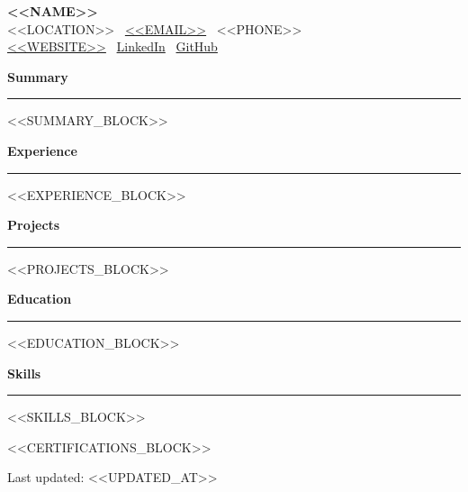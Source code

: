 \documentclass[10pt,a4paper]{article}
\newcommand{\sectionline}{\vspace{3pt}\hrule\vspace{5pt}}
\newcommand{\resheading}[1]{\textbf{\large #1}\sectionline}
\begin{document}
{\LARGE \textbf{<<NAME>>}}\\
<<LOCATION>> \textbar\ \href{mailto:<<EMAIL>>}{<<EMAIL>>} \textbar\ <<PHONE>>\\
\href{<<WEBSITE>>}{<<WEBSITE>>} \textbar\ \href{<<LINKEDIN>>}{LinkedIn} \textbar\ \href{<<GITHUB>>}{GitHub}

\resheading{Summary}
<<SUMMARY_BLOCK>>

\resheading{Experience}
<<EXPERIENCE_BLOCK>>

\resheading{Projects}
<<PROJECTS_BLOCK>>

\resheading{Education}
<<EDUCATION_BLOCK>>

\resheading{Skills}
<<SKILLS_BLOCK>>

<<CERTIFICATIONS_BLOCK>>

\vfill
{\footnotesize Last updated: <<UPDATED_AT>>}
\end{document}
